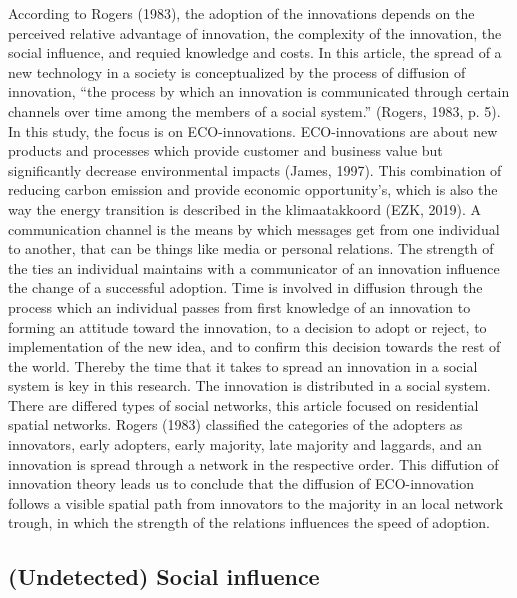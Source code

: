 \documentclass[man,floatsintext]{apa6}
\begin{document}
According to Rogers (1983), the adoption of the innovations depends on
the perceived relative advantage of innovation, the complexity of the
innovation, the social influence, and requied knowledge and costs. In
this article, the spread of a new technology in a society is
conceptualized by the process of diffusion of innovation, \enquote{the
process by which an innovation is communicated through certain channels
over time among the members of a social system.} (Rogers, 1983, p. 5).
In this study, the focus is on ECO-innovations. ECO-innovations are
about new products and processes which provide customer and business
value but significantly decrease environmental impacts (James, 1997).
This combination of reducing carbon emission and provide economic
opportunity's, which is also the way the energy transition is described
in the klimaatakkoord (EZK, 2019). A communication channel is the means
by which messages get from one individual to another, that can be things
like media or personal relations. The strength of the ties an individual
maintains with a communicator of an innovation influence the change of a
successful adoption. Time is involved in diffusion through the process
which an individual passes from first knowledge of an innovation to
forming an attitude toward the innovation, to a decision to adopt or
reject, to implementation of the new idea, and to confirm this decision
towards the rest of the world. Thereby the time that it takes to spread
an innovation in a social system is key in this research. The innovation
is distributed in a social system. There are differed types of social
networks, this article focused on residential spatial networks. Rogers
(1983) classified the categories of the adopters as innovators, early
adopters, early majority, late majority and laggards, and an innovation
is spread through a network in the respective order. This diffution of
innovation theory leads us to conclude that the diffusion of
ECO-innovation follows a visible spatial path from innovators to the
majority in an local network trough, in which the strength of the
relations influences the speed of adoption.

\subsection{(Undetected) Social
influence}\label{undetected-social-influence}
\end{document}
